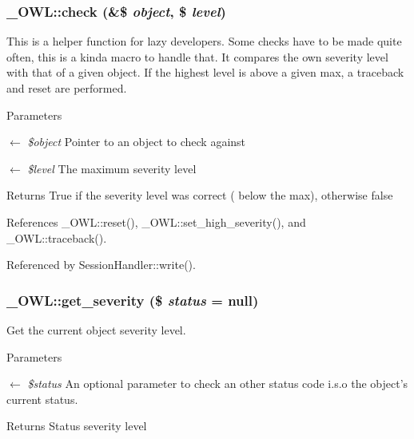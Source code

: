 \subsubsection[{check}]{\setlength{\rightskip}{0pt plus 5cm}\_\-OWL::check (\&\$ {\em object}, \/  \$ {\em level})}\label{class__OWL_ad6f4f6946f40199dd0333cf219fa500e}
This is a helper function for lazy developers. Some checks have to be made quite often, this is a kinda macro to handle that. It compares the own severity level with that of a given object. If the highest level is above a given max, a traceback and reset are performed.


\begin{DoxyParams}{Parameters}
\item[\mbox{$\leftarrow$} {\em \$object}]Pointer to an object to check against \item[\mbox{$\leftarrow$} {\em \$level}]The maximum severity level \end{DoxyParams}
\begin{DoxyReturn}{Returns}
True if the severity level was correct ( below the max), otherwise false 
\end{DoxyReturn}


References \_\-OWL::reset(), \_\-OWL::set\_\-high\_\-severity(), and \_\-OWL::traceback().



Referenced by SessionHandler::write().

\subsubsection[{get\_\-severity}]{\setlength{\rightskip}{0pt plus 5cm}\_\-OWL::get\_\-severity (\$ {\em status} = {\ttfamily null})}\label{class__OWL_adf9509ef96858be7bdd9414c5ef129aa}
Get the current object severity level.


\begin{DoxyParams}{Parameters}
\item[\mbox{$\leftarrow$} {\em \$status}]An optional parameter to check an other status code i.s.o the object's current status. \end{DoxyParams}
\begin{DoxyReturn}{Returns}
Status severity level 
\end{DoxyReturn}


